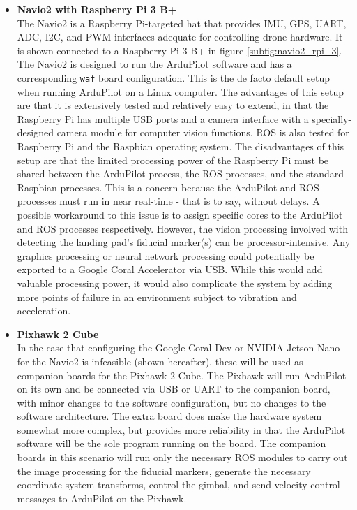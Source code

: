 \begin{itemize}
    \item \textbf{Navio2 with Raspberry Pi 3 B+} \\ The Navio2 is a Raspberry Pi-targeted hat that provides \gls{IMU}, \gls{GPS}, \gls{UART}, \gls{ADC}, \gls{I2C}, and \gls{PWM} interfaces adequate for controlling drone hardware. It is shown connected to a Raspberry Pi 3 B+ in figure \ref{subfig:navio2_rpi_3}. The Navio2 is designed to run the ArduPilot software and has a corresponding \texttt{waf} board configuration. This is the de facto default setup when running ArduPilot on a Linux computer. The advantages of this setup are that it is extensively tested and relatively easy to extend, in that the Raspberry Pi has multiple USB ports and a camera interface with a specially-designed camera module for computer vision functions. \gls{ROS} is also tested for Raspberry Pi and the Raspbian operating system. The disadvantages of this setup are that the limited processing power of the Raspberry Pi must be shared between the ArduPilot process, the \gls{ROS} processes, and the standard Raspbian processes. This is a concern because the ArduPilot and \gls{ROS} processes must run in near real-time - that is to say, without delays. A possible workaround to this issue is to assign specific cores to the ArduPilot and \gls{ROS} processes respectively. However, the vision processing involved with detecting the landing pad's fiducial marker(s) can be processor-intensive. Any graphics processing or neural network processing could potentially be exported to a Google Coral Accelerator via USB. While this would add valuable processing power, it would also complicate the system by adding more points of failure in an environment subject to vibration and acceleration.
    \item \textbf{Pixhawk 2 Cube} \\ In the case that configuring the Google Coral Dev or NVIDIA Jetson Nano for the Navio2 is infeasible (shown hereafter), these will be used as companion boards for the Pixhawk 2 Cube. The Pixhawk will run ArduPilot on its own and be connected via USB or UART to the companion board, with minor changes to the software configuration, but no changes to the software architecture. The extra board does make the hardware system somewhat more complex, but provides more reliability in that the ArduPilot software will be the sole program running on the board. The companion boards in this scenario will run only the necessary ROS modules to carry out the image processing for the fiducial markers, generate the necessary coordinate system transforms, control the gimbal, and send velocity control messages to ArduPilot on the Pixhawk.

\end{itemize}
